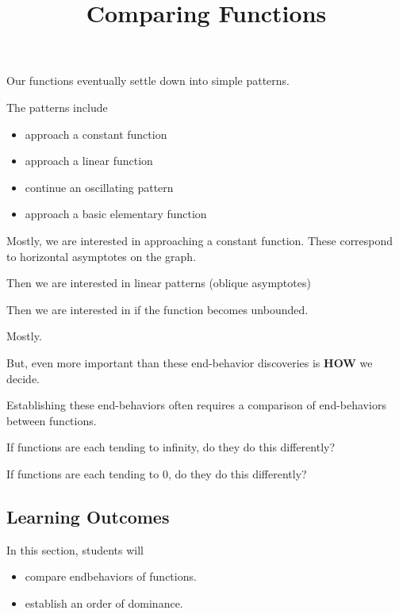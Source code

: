 \documentclass{ximera}
\title{Comparing Functions}
\begin{document}
\begin{abstract}
\end{abstract}
\maketitle







Our functions eventually settle down into simple patterns.  

The patterns include

\begin{itemize}
\item approach a constant function
\item approach a linear function
\item continue an oscillating pattern
\item approach a basic elementary function 
\end{itemize}


Mostly, we are interested in approaching a constant function.  These correspond to horizontal asymptotes on the graph.

Then we are interested in linear patterns (oblique asymptotes)

Then we are interested in if the function becomes unbounded.

Mostly.


But, even more important than these end-behavior discoveries is \textbf{HOW} we decide.

Establishing these end-behaviors often requires a comparison of end-behaviors between functions.  


If functions are each tending to infinity, do they do this differently?


If functions are each tending to $0$, do they do this differently?















\subsection*{Learning Outcomes}


\begin{sectionOutcomes}
In this section, students will 

\begin{itemize}
\item compare endbehaviors of functions.
\item establish an order of dominance.
\end{itemize}
\end{sectionOutcomes}
\end{document}

